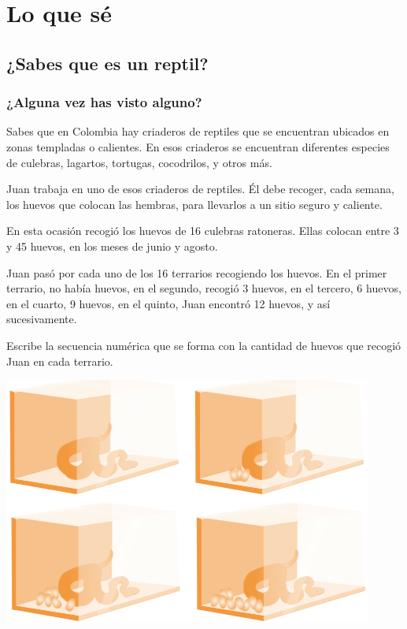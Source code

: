 \documentclass[10pt,twoside]{article}
\begin{document}
\section*{Lo que s\'{e}}
\subsection*{¿Sabes que es un reptil?}
\subsubsection*{¿Alguna vez has visto alguno?}
Sabes que en Colombia hay criaderos de reptiles que se
encuentran ubicados en zonas templadas o calientes. En esos
criaderos se encuentran diferentes especies de culebras, lagartos, tortugas, cocodrilos, y otros más.
\begin{itemize}
\item Juan trabaja en uno de esos criaderos de reptiles. Él debe recoger, cada semana, los huevos que colocan las hembras, para llevarlos a un sitio seguro y caliente.
\item En esta ocasión recogió los huevos de 16 culebras ratoneras. Ellas colocan entre 3 y 45 huevos, en los meses de junio y agosto.

\begin{minipage}{.35\textwidth}
\item Juan pasó por cada uno de los 16 terrarios recogiendo los huevos. En el primer terrario, no había huevos, en el segundo, recogió 3 huevos, en el tercero, 6 huevos, en el cuarto, 9 huevos, en el quinto, Juan encontró 12 huevos, y así sucesivamente.
\item Escribe la secuencia numérica que se forma con la cantidad de huevos que recogió Juan en cada terrario.
\end{minipage}\hfill
\begin{minipage}{.65\textwidth}
\includegraphics[scale=.5]{Images/culebras.png} 
\end{minipage}
\end{itemize}
\end{document}
